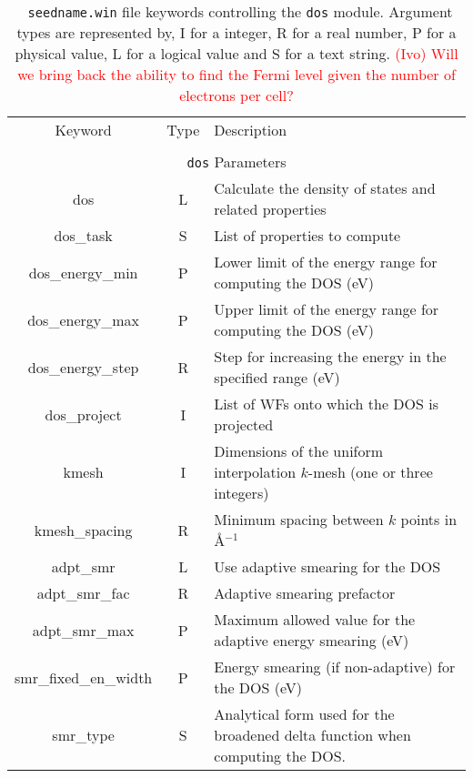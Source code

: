 \begin{table}[hH!]
\begin{center}
\begin{tabular}{|c|c|p{6cm}|}
  \hline
  Keyword & Type & Description \\
  &      &             \\
  \hline\hline
  \multicolumn{3}{|c|}{{\tt dos} Parameters} \\
  \hline
  {\sc dos}  & L & Calculate the density of states and related properties\\
  {\sc dos\_task}& S  & List of properties to compute \\
  {\sc dos\_energy\_min} & P & Lower limit of the energy range for
  computing the DOS (eV)\\
  {\sc dos\_energy\_max}& P & Upper limit of the energy range for
  computing the DOS (eV)\\
  {\sc dos\_energy\_step}& R & Step for increasing the energy in the specified range (eV)\\
  {\sc dos\_project}& I & List of WFs onto which the DOS is projected\\
  {\sc [dos\_]kmesh} & I & Dimensions of the uniform interpolation $k$-mesh (one or three integers)\\ 
  {\sc [dos\_]kmesh\_spacing}& R & Minimum spacing between $k$ points in \AA$^{-1}$\\
  {\sc [dos\_]adpt\_smr} & L & Use adaptive smearing for the DOS \\
  {\sc [dos\_]adpt\_smr\_fac} & R & Adaptive smearing prefactor\\
  {\sc [dos\_]adpt\_smr\_max} & P & Maximum allowed value for the adaptive energy smearing (eV) \\
  {\sc [dos\_]smr\_fixed\_en\_width} & P  & Energy smearing (if non-adaptive) for the DOS (eV) \\   
  {\sc [dos\_]smr\_type} & S & Analytical form used for the broadened delta function
  when computing the DOS. \\
  \hline
\end{tabular}
\caption[Parameter file keywords controlling the DOS module.]  {{\tt
    seedname.win} file keywords controlling the {\tt dos}
  module. Argument types are represented by, I for a integer, R for a
  real number, P for a physical value, L for a logical value and S for
  a text string.  \textcolor{red}{(Ivo) Will we bring back the ability
    to find the Fermi level given the number of electrons per cell?}
}
\label{parameter_keywords_dos}
\end{center}
\end{table}


